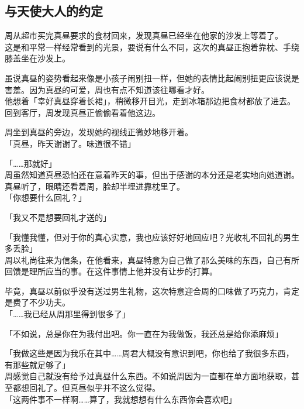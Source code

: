 \subsection{与天使大人的约定}

周从超市买完真昼要求的食材回来，发现真昼已经坐在他家的沙发上等着了。\\

这是和平常一样经常看到的光景，要说有什么不同，这次的真昼正抱着靠枕、手绕膝盖坐在沙发上。

虽说真昼的姿势看起来像是小孩子闹别扭一样，但她的表情比起闹别扭更应该说是害羞。因为真昼的可爱，周也有点不知道该往哪看才好。\\

他想着「幸好真昼穿着长裙」，稍微移开目光，走到冰箱那边把食材都放了进去。回到客厅，周发现真昼正偷偷看着他这边。

周坐到真昼的旁边，发现她的视线正微妙地移开着。\\

「真昼，昨天谢谢了。味道很不错」

「……那就好」\\

周虽然知道真昼恐怕还在意着昨天的事，但出于感谢的本分还是老实地向她道谢。真昼听了，眼睛还看着周，脸却半埋进靠枕里了。\\

「你想要什么回礼？」

「我又不是想要回礼才送的」

「我懂我懂，但对于你的真心实意，我也应该好好地回应吧？光收礼不回礼的男生多丢脸」\\

周以礼尚往来为信条，在他看来，真昼特意为自己做了那么美味的东西，自己有所回馈是理所应当的事。在这件事情上他并没有让步的打算。

毕竟，真昼以前似乎没有送过男生礼物，这次特意迎合周的口味做了巧克力，肯定是费了不少功夫。\\

「……我已经从周那里得到很多了」

「不如说，总是你在为我付出吧。你一直在为我做饭，我还总是给你添麻烦」

「我做这些是因为我乐在其中……周君大概没有意识到吧，你也给了我很多东西，有那些就足够了」\\

周感觉自己就没有给予过真昼什么东西。不如说周因为一直都在单方面地获取，甚至都想回礼了。但真昼似乎并不这么觉得。\\

「这两件事不一样啊……算了，我就想想有什么东西你会喜欢吧」\\

